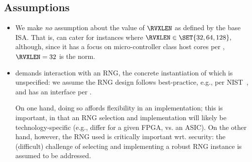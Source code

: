 
\subsection{Assumptions}
\label{sec:bg:assumption}

\begin{itemize}

\item We make {\em no} assumption about the value of $\RVXLEN$ as defined
      by the base ISA.  That is, \XCID can cater for instances where
      $
      \RVXLEN \in \SET{ 32, 64, 128 } ,
      $
      although, since it has a focus on micro-controller class host cores
      per ,
      $
      \RVXLEN = 32
      $
      is the norm.

\item \XCID demands interaction with an RNG, the concrete instantiation of 
      which is unspecified: we assume the RNG design follows best-practice,
      e.g., per NIST~\cite{SCARV:NIST:SP:800_90a,SCARV:NIST:SP:800_90b,SCARV:NIST:SP:800_90c},
      and has an interface per \cite[Section 6.4]{SCARV:NIST:SP:800_90c}.

      On one hand, doing so affords flexibility in an implementation; this 
      is important, in that an RNG selection and implementation will likely 
      be technology-specific (e.g., differ for a given FPGA, vs. an ASIC).  
      On the other hand, however, the RNG used is critically important wrt. 
      security: the (difficult) challenge of selecting and implementing 
      a robust RNG instance is assumed to be addressed.

\end{itemize}

